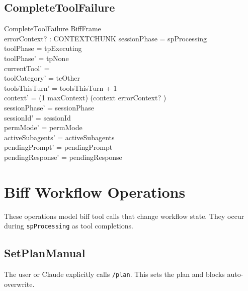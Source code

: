 \documentclass[a4paper,10pt,fleqn]{article}
\begin{document}
\subsection{CompleteToolFailure}

\begin{schema}{CompleteToolFailure}
  BiffFrame \\
  errorContext? : CONTEXTCHUNK
  \where
  sessionPhase = spProcessing \\
  toolPhase = tpExecuting \\
  toolPhase' = tpNone \\
  currentTool' = \emptyset \\
  toolCategory' = tcOther \\
  toolsThisTurn' = toolsThisTurn + 1 \\
  context' = (1 \upto maxContext) \dres (context \cat \langle errorContext? \rangle) \\
  sessionPhase' = sessionPhase \\
  sessionId' = sessionId \\
  permMode' = permMode \\
  activeSubagents' = activeSubagents \\
  pendingPrompt' = pendingPrompt \\
  pendingResponse' = pendingResponse
\end{schema}

\section{Biff Workflow Operations}

These operations model biff tool calls that change workflow state.
They occur during \texttt{spProcessing} as tool completions.

\subsection{SetPlanManual}

The user or Claude explicitly calls \texttt{/plan}. This sets the
plan and blocks auto-overwrite.
\end{document}
